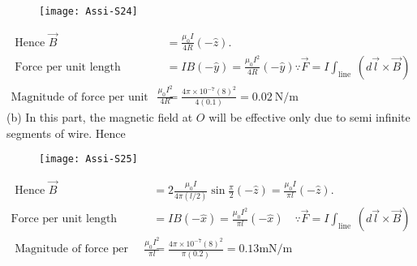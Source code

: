 \begin{enumerate}
\begin{answer}
			 	\begin{figure}[H]
			 	\centering
			 	\texttt{[image: Assi-S24]}
			 \end{figure}
		\begin{align*}
	\text{	Hence }\vec{B}&=\frac{\mu_{0} I}{4 R}(-\hat{z}).\\
\text{	Force per unit length }&=I B(-\hat{y})=\frac{\mu_{0} I^{2}}{4 R}(-\hat{y})
	\because \vec{F}=I \int_{\text {line }}(d \vec{l} \times \vec{B})\\
	\text{Magnitude of force per unit length is }\frac{\mu_{0} I^{2}}{4 R}&=\frac{4 \pi \times 10^{-7}(8)^{2}}{4(0.1)}=0.02 \mathrm{~N} / \mathrm{m}
		\end{align*}
		(b) In this part, the magnetic field at $O$ will be effective only due to semi infinite segments of wire. Hence
			\begin{figure}[H]
			\centering
			\texttt{[image: Assi-S25]}
		\end{figure}
			\begin{align*}
		\text{	Hence }\vec{B}&=2 \frac{\mu_{0} I}{4 \pi(l / 2)} \sin \frac{\pi}{2}(-\hat{z})=\frac{\mu_{0} I}{\pi l}(-\hat{z}).\\
		\text{Force per unit length }&=I B(-\hat{x})=\frac{\mu_{0} I^{2}}{\pi l}(-\hat{x}) \quad \because \vec{F}=I \int_{\text {line }}(d \vec{l} \times \vec{B})\\
	\text{	Magnitude of force per unit length is }\frac{\mu_{0} I^{2}}{\pi l}&=\frac{4 \pi \times 10^{-7}(8)^{2}}{\pi(0.2)}=0.13 \mathrm{mN} / \mathrm{m}
			\end{align*}
	\end{answer}
	
	
	
	
\end{enumerate}